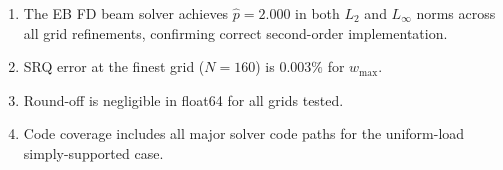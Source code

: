 \documentclass[11pt,letterpaper]{article}
\newcommand{\pobs}{\hat{p}}
\begin{document}
\begin{enumerate}[nosep]
  \item The EB FD beam solver achieves $\pobs = 2.000$ in both $L_2$ and $L_\infty$
    norms across all grid refinements, confirming correct second-order implementation.
  \item SRQ error at the finest grid ($N=160$) is $0.003\%$ for $w_{\max}$.
  \item Round-off is negligible in float64 for all grids tested.
  \item Code coverage includes all major solver code paths for the uniform-load
    simply-supported case.
\end{enumerate}
\end{document}
